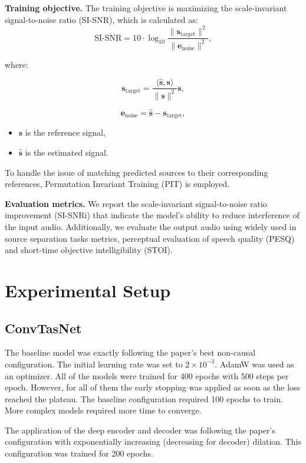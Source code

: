 \documentclass[10pt,conference,compsocconf]{IEEEtran}
\begin{document}
\textbf{Training objective.} The training objective is maximizing the scale-invariant signal-to-noise ratio (SI-SNR), which is calculated as:
\[
\text{SI-SNR} = 10 \cdot \log_{10} \frac{\| \mathbf{s}_{\text{target}} \|^2}{\| \mathbf{e}_{\text{noise}} \|^2},
\]

where:

\[
\mathbf{s}_{\text{target}} = \frac{\langle \hat{\mathbf{s}}, \mathbf{s} \rangle}{\|\mathbf{s}\|^2} \mathbf{s},
\]

\[
\mathbf{e}_{\text{noise}} = \hat{\mathbf{s}} - \mathbf{s}_{\text{target}},
\]

\begin{itemize}
    \item \(\mathbf{s}\) is the reference signal,
    \item \(\hat{\mathbf{s}}\) is the estimated signal.
\end{itemize}

To handle the issue of matching predicted sources to their corresponding references, Permutation Invariant Training (PIT) is employed.

\textbf{Evaluation metrics.} We report the scale-invariant signal-to-noise ratio improvement (SI-SNRi)\cite{vincent2006performance} that indicate the  model's ability to reduce interference of the input audio. Additionally, we evaluate the output audio using widely used in source separation tasks metrics,  perceptual evaluation of speech quality (PESQ) and short-time objective intelligibility (STOI). 

\section{Experimental Setup}\label{sec:experimental_setup}

\subsection{\textbf{ConvTasNet}} The baseline model was exactly following the paper's\cite{luo2019convtasnet} best non-causal configuration. The initial learning rate was set to $2 \times 10^{-3}$. AdamW was used as an optimizer. All of the models were trained for 400 epochs with 500 steps per epoch. However, for all of them the early stopping was applied as soon as the loss reached the plateau. The baseline configuration required 100 epochs to train. More complex models required more time to converge.

The application of the deep encoder and decoder was following the paper's\cite{kadioglu2020empirical} configuration with exponentially increasing (decreasing for decoder) dilation. This configuration was trained for 200 epochs.
\end{document}
